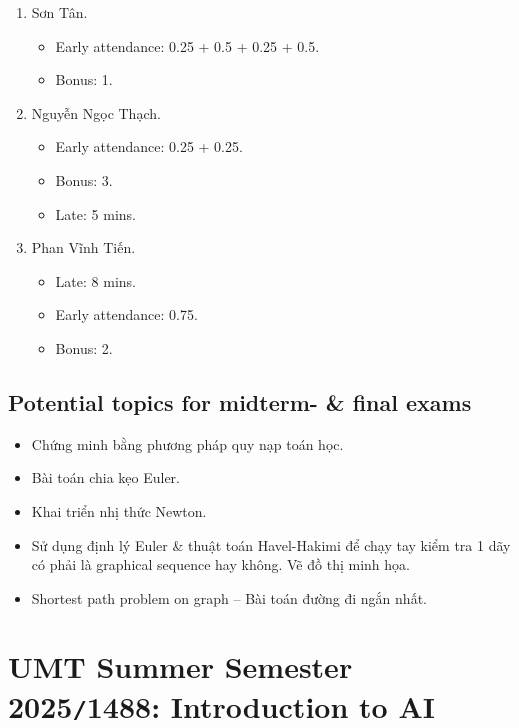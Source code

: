 \documentclass{article}
\begin{document}
\begin{enumerate}
\begin{itemize}
	\end{itemize}
	\item {\sc Sơn Tân.}
	\begin{itemize}
		\item Early attendance: 0.25 + 0.5 + 0.25 + 0.5.
		\item Bonus: 1.
	\end{itemize}
	\item {\sc Nguyễn Ngọc Thạch.}
	\begin{itemize}
		\item Early attendance: 0.25 + 0.25.
		\item Bonus: 3.
		\item Late: 5 mins.
	\end{itemize}
	\item {\sc Phan Vĩnh Tiến.}
	\begin{itemize}
		\item Late: 8 mins.
		\item Early attendance: 0.75.
		\item Bonus: 2.
	\end{itemize}
\end{enumerate}


\subsection{Potential topics for midterm- \& final exams}

\begin{itemize}
	\item Chứng minh bằng phương pháp quy nạp toán học.
	\item Bài toán chia kẹo Euler.
	\item Khai triển nhị thức Newton.
	\item Sử dụng định lý Euler \& thuật toán Havel-Hakimi để chạy tay kiểm tra 1 dãy có phải là graphical sequence hay không. Vẽ đồ thị minh họa.
	\item Shortest path problem on graph -- Bài toán đường đi ngắn nhất.
\end{itemize}


\section{UMT Summer Semester 2025{\tt/}1488: Introduction to AI}
\end{document}
